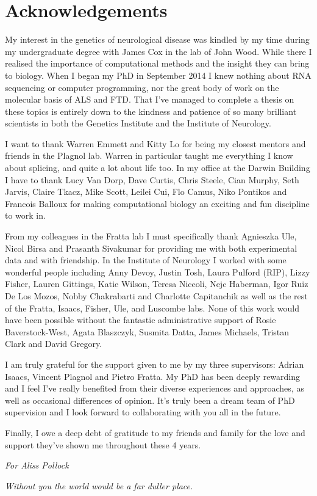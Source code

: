 \pagebreak
\clearpage

\section*{Acknowledgements}

My interest in the genetics of neurological disease was kindled by my time during my undergraduate degree with James Cox in the lab of John Wood.
While there I realised the importance of computational methods and the insight they can bring to biology.  
When I began my PhD in September 2014 I knew nothing about RNA sequencing or computer programming, nor the great body of work on the molecular basis of ALS and FTD. 
That I've managed to complete a thesis on these topics is entirely down to the kindness and patience of so many brilliant scientists in both the Genetics Institute and the Institute of Neurology.  

I want to thank Warren Emmett and Kitty Lo for being my closest mentors and friends in the Plagnol lab. 
Warren in particular taught me everything I know about splicing, and quite a lot about life too.
In my office at the Darwin Building I have to thank Lucy Van Dorp, Dave Curtis, Chris Steele, Cian Murphy, Seth Jarvis, Claire Tkacz, Mike Scott, Leilei Cui, Flo Camus, Niko Pontikos and Francois Balloux for making computational biology an exciting and fun discipline to work in.

From my colleagues in the Fratta lab I must specifically thank Agnieszka Ule, Nicol Birsa and Prasanth Sivakumar for providing me with both experimental data and with friendship.
In the Institute of Neurology I worked with some wonderful people including Anny Devoy, Justin Tosh, Laura Pulford (RIP), Lizzy Fisher, Lauren Gittings, Katie Wilson, Teresa Niccoli, Nejc Haberman, Igor Ruiz De Los Mozos, Nobby Chakrabarti and Charlotte Capitanchik as well as the rest of the Fratta, Isaacs, Fisher, Ule, and Luscombe labs.
None of this work would have been possible without the fantastic administrative support of Rosie Baverstock-West, Agata Blaszczyk, Susmita Datta, James Michaels, Tristan Clark and David Gregory.

I am truly grateful for the support given to me by my three supervisors: Adrian Isaacs, Vincent Plagnol and Pietro Fratta. 
My PhD has been deeply rewarding and I feel I've really benefited from their diverse experiences and approaches, as well as occasional differences of opinion.
It's truly been a dream team of PhD supervision and I look forward to collaborating with you all in the future.

Finally, I owe a deep debt of gratitude to my friends and family for the love and support they've shown me throughout these 4 years.
\vspace{10mm}

\begingroup
\centering
\textit{For Aliss Pollock}

\textit{Without you the world would be a far duller place.}


\endgroup
